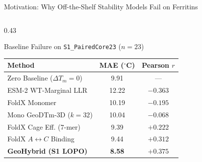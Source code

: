 \documentclass[aspectratio=169,10pt]{beamer}
\newcommand{\DTm}{\ensuremath{\Delta T_m}}
\newcommand{\code}[1]{\texttt{\detokenize{#1}}}
\begin{document}
\begin{frame}{Motivation: Why Off-the-Shelf Stability Models Fail on Ferritins}
\begin{columns}[T,totalwidth=\textwidth]
    \begin{column}{0.43\textwidth}
      \begin{exampleblock}{\footnotesize Baseline Failure on \texttt{S1\_PairedCore23} ($n=23$)}
        \centering
        \setlength{\tabcolsep}{4pt}
        \fontsize{7.5}{9.5}\selectfont
        \begin{tabular}{@{}lcc@{}}
          \toprule
          \textbf{Method} & \textbf{MAE ($^\circ$C)} & \textbf{Pearson $r$} \\
          \midrule
          Zero Baseline ($\DTm=0$) & 9.91 & --- \\
          ESM-2 WT-Marginal LLR & 12.22 & \textcolor{mpuRed}{$-0.363$} \\
          FoldX Monomer & 10.19 & \textcolor{mpuRed}{$-0.195$} \\
          Mono GeoDTm-3D ($k=32$) & 10.04 & $-0.068$ \\
          \midrule
          FoldX Cage Eff. (7-mer) & 9.39 & \textcolor{mpuTeal}{$+0.222$} \\
          FoldX $A{\leftrightarrow}C$ Binding & 9.44 & \textcolor{mpuTeal}{$+0.312$} \\
          \textbf{GeoHybrid (S1 LOPO)} & \textbf{8.58} & \textbf{\textcolor{mpuNavy}{$+0.375$}} \\
          \bottomrule
        \end{tabular}
      \end{exampleblock}

      \vspace*{2pt}
    \end{column}
  \end{columns}
\end{frame}
\end{document}
